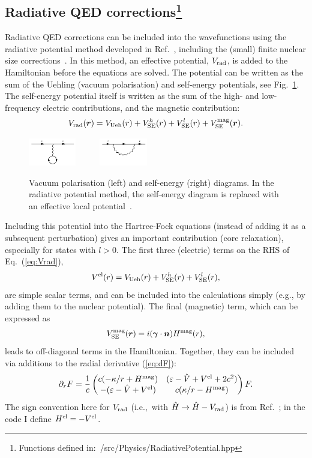 \documentclass[10pt,twocolumn,a4paper]{article}%
\newcommand{\matr}[4]{\ensuremath{\begin{pmatrix}#1&#2\\#3&#4\end{pmatrix}}}	%
\renewcommand{\v}[1]{\ensuremath{\boldsymbol{#1}}}		%
\newcommand{\be}{\begin{equation}}
\newcommand{\ee}{\end{equation}}
\def\en{\ensuremath{\varepsilon}}
\def\p{\ensuremath{\partial}}
\renewcommand{\k}{\ensuremath{\kappa}}
\begin{document}




\subsection[Radiative QED corrections]{Radiative QED corrections\footnote{Functions defined in:~/src/Physics/RadiativePotential.hpp}}

Radiative QED corrections can be included into the wavefunctions using the radiative potential method developed in Ref.~\cite{FlambaumQED2005}, including the (small) finite nuclear size corrections~\cite{GingesQED2015,Ginges2016}.
In this method, an effective potential, $V_{\rm rad}$,
is added to the Hamiltonian before the equations are solved.
The potential can be written as the sum of the Uehling (vacuum polarisation) and self-energy potentials, see Fig.~\ref{fig:QED}.
The self-energy potential itself is written as the sum of the high- and low-frequency electric contributions, and the magnetic contribution:
\be\label{eq:Vrad}
V_{\rm rad}(\v{r}) = V_{\rm Ueh}(r) + V_{\rm SE}^{h}(r) +  V_{\rm SE}^{l}(r) + V_{\rm SE}^{\rm mag}(\v{r}).
\ee


\begin{figure}%
\centering\tiny
\includegraphics[width=0.185\textwidth]{img/VacuumPol}~~~~~
\includegraphics[width=0.185\textwidth]{img/SelfEnergy}
\caption{\small Vacuum polarisation (left) and self-energy (right) diagrams. In the radiative potential method, the self-energy diagram is replaced with an effective local potential~\cite{FlambaumQED2005}.\label{fig:QED}}
\end{figure}

Including this potential into the Hartree-Fock equations (instead of adding it as a subsequent perturbation) gives an important contribution (core relaxation), especially for states with $l>0$.
The first three (electric) terms on the RHS of Eq.~(\ref{eq:Vrad}),
\be
V^{\rm el}(r) =  V_{\rm Ueh}(r) +V_{\rm SE}^{h}(r) + V_{\rm SE}^{l}(r) ,
\ee
are simple scalar terms, and can be included into the calculations simply (e.g., by adding them to the nuclear potential).
The final (magnetic) term, which can be expressed as~\cite{Ginges2016}
\be
V_{\rm SE}^{\rm mag}(\v{r}) = i (\v{\gamma}\cdot\v{n}) H^{\rm mag}(r),
\ee
leads to off-diagonal terms in the Hamiltonian.
Together, they can be included via additions to the radial derivative (\ref{eq:dF}):
\be\label{eq:dF-Hmag}
\p_r F  =\frac{1}{c} \matr 	{c(-{\k}/{r} + H^{\rm mag})} 	{(\en - \hat V + V^{\rm el} + 2c^2)}  {-(\en - \hat V+ V^{\rm el} )} 	 {c({\k}/{r} - H^{\rm mag})}F.
\ee
The sign convention here for $V_{\rm rad}$ (i.e.,\ with $\hat H \to \hat H -V_{\rm rad}$) is from Ref.~\cite{FlambaumQED2005}; in the code I define $H^{\rm el}=-V^{\rm el}$.
%
\end{document}
